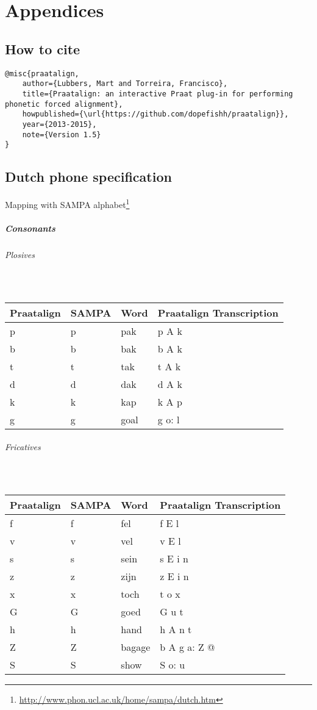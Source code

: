 \chapter{Appendices}
\section{How to cite}
\begin{lstlisting}[caption={Bibtex snippet}]
@misc{praatalign,
	author={Lubbers, Mart and Torreira, Francisco},
	title={Praatalign: an interactive Praat plug-in for performing phonetic forced alignment},
	howpublished={\url{https://github.com/dopefishh/praatalign}},
	year={2013-2015},
	note={Version 1.5}
}
\end{lstlisting}

\newpage
\section{Dutch phone specification}
\label{sec:sldutch}
Mapping with SAMPA
alphabet\footnote{\url{http://www.phon.ucl.ac.uk/home/sampa/dutch.htm}}

\paragraph{Consonants}
\subparagraph{Plosives}\strut\\
\begin{tabular}{llll}
	Praatalign & SAMPA & Word & Praatalign Transcription\\
	\hline
		p & p & pak & p A k\\
		b & b & bak & b A k\\
		t & t & tak & t A k\\
		d & d & dak & d A k\\
		k & k & kap & k A p\\
		g & g & goal & g o: l
\end{tabular}

\subparagraph{Fricatives}\strut\\
\begin{tabular}{llll}
	Praatalign & SAMPA & Word & Praatalign Transcription\\
	\hline
	f & f & fel & f E l\\
	v & v & vel & v E l\\
	s & s & sein & s E i n\\
	z & z & zijn & z E i n\\
	x & x & toch & t o x\\
	G & G & goed & G u t\\
	h & h & hand & h A n t\\
	Z & Z & bagage & b A g a: Z @\\
	S & S & show & S o: u
\end{tabular}

